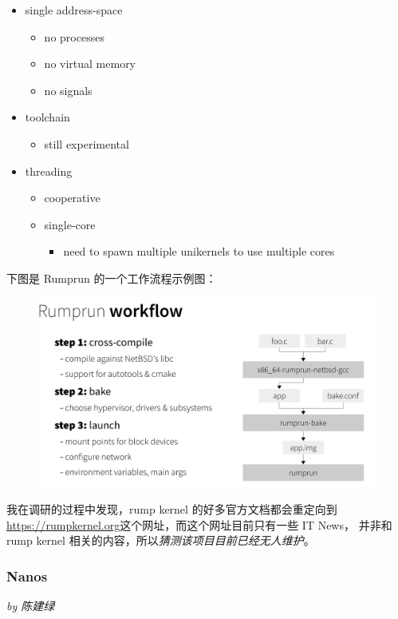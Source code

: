 \documentclass[UTF8,fontset=none,linespread=1.15]{ctexart}
\newcommand{\sectionauthor}[1]{%
\vspace*{-5ex}
\noindent\textrm{\hfill\textit{by #1}}
\vspace*{3ex}\par}
\begin{document}
\begin{itemize}
\item single address-space
    \begin{itemize}
    \item no processes
    \item no virtual memory
    \item no signals
    \end{itemize}
\item toolchain
    \begin{itemize}
    \item still experimental
    \end{itemize}
\item threading
    \begin{itemize}
    \item cooperative
    \item single-core
        \begin{itemize}
        \item need to spawn multiple unikernels to use multiple cores
        \end{itemize}
    \end{itemize}
\end{itemize}

下图是 Rumprun 的一个工作流程示例图：
\begin{figure}[H]
\includegraphics[width=\linewidth]{pictures/rumprun-3.png}
\caption{}
\end{figure}

我在调研的过程中发现，rump kernel 的好多官方文档都会重定向到
\url{https://rumpkernel.org}这个网址，而这个网址目前只有一些 IT News，
并非和 rump kernel 相关的内容，所以\textit{猜测该项目目前已经无人维护}。

\subsubsection{Nanos}\sectionauthor{陈建绿}
\end{document}

